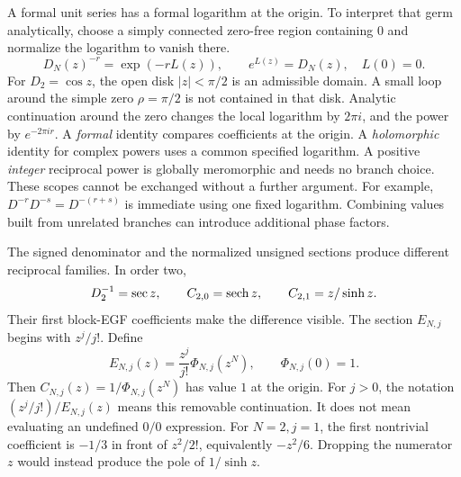 A formal unit series has a formal logarithm at the origin. To interpret that germ analytically, choose a simply connected zero-free region containing $0$ and normalize the logarithm to vanish there.
\[
D_N(z)^{-r}=\exp(-rL(z)),\qquad e^{L(z)}=D_N(z),\quad L(0)=0.
\]
For $D_2=\cos z$, the open disk $|z|<\pi/2$ is an admissible domain. A small loop around the simple zero $\rho=\pi/2$ is not contained in that disk. Analytic continuation around the zero changes the local logarithm by $2\pi i$, and the power by $e^{-2\pi ir}$.
A \emph{formal} identity compares coefficients at the origin. A \emph{holomorphic} identity for complex powers uses a common specified logarithm. A positive \emph{integer} reciprocal power is globally meromorphic and needs no branch choice. These scopes cannot be exchanged without a further argument.
For example, $D^{-r}D^{-s}=D^{-(r+s)}$ is immediate using one fixed logarithm. Combining values built from unrelated branches can introduce additional phase factors.

The signed denominator and the normalized unsigned sections produce different reciprocal families. In order two,
\[
D_2^{-1}=\sec z,\qquad C_{2,0}=\operatorname{sech} z,\qquad C_{2,1}=z/\sinh z.
\]
Their first block-EGF coefficients make the difference visible.
The section $E_{N,j}$ begins with $z^j/j!$. Define
\[
E_{N,j}(z)=\frac{z^j}{j!}\Phi_{N,j}(z^N),\qquad\Phi_{N,j}(0)=1.
\]
Then $C_{N,j}(z)=1/\Phi_{N,j}(z^N)$ has value $1$ at the origin. For $j>0$, the notation $(z^j/j!)/E_{N,j}(z)$ means this removable continuation. It does not mean evaluating an undefined $0/0$ expression.
For $N=2,j=1$, the first nontrivial coefficient is $-1/3$ in front of $z^2/2!$, equivalently $-z^2/6$. Dropping the numerator $z$ would instead produce the pole of $1/\sinh z$.

